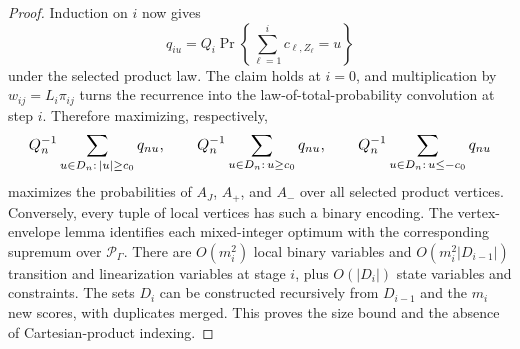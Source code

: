 \documentclass{article}
\begin{document}
\begin{proof}
Induction on \(i\) now gives
\[q_{iu}=Q_i\Pr\left\{\sum_{\ell=1}^i c_{\ell,Z_\ell}=u\right\}\]
under the selected product law. The claim holds at \(i=0\), and multiplication by \(w_{ij}=L_i\pi_{ij}\) turns the recurrence into the law-of-total-probability convolution at step \(i\). Therefore maximizing, respectively,
\[
\makebox[\linewidth][c]{\resizebox{0.98\linewidth}{!}{\par\noindent \makebox[\linewidth][c]{\resizebox{0.98\linewidth}{!}{\(\displaystyle \displaystyle Q_n^{-1}\sum_{u\in D_n:\,|u|\ge c_0}q_{nu},\qquad Q_n^{-1}\sum_{u\in D_n:\,u\ge c_0}q_{nu},\qquad Q_n^{-1}\sum_{u\in D_n:\,u\le-c_0}q_{nu}\)}}\par\noindent}}
\]
maximizes the probabilities of \(A_J\), \(A_+\), and \(A_-\) over all selected product vertices. Conversely, every tuple of local vertices has such a binary encoding. The vertex-envelope lemma identifies each mixed-integer optimum with the corresponding supremum over \(\mathcal P_\Gamma\). There are \(O(m_i^2)\) local binary variables and \(O(m_i^2|D_{i-1}|)\) transition and linearization variables at stage \(i\), plus \(O(|D_i|)\) state variables and constraints. The sets \(D_i\) can be constructed recursively from \(D_{i-1}\) and the \(m_i\) new scores, with duplicates merged. This proves the size bound and the absence of Cartesian-product indexing.
\end{proof}
\end{document}
